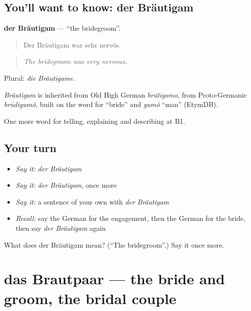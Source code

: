 \subsection*{You'll want to know: der Bräutigam}
\textbf{der Bräutigam} — \textquotedblleft{}the bridegroom\textquotedblright{}.

\begin{quote}
Der Bräutigam war sehr nervös.
\end{quote}

\begin{quote}
\emph{The bridegroom was very nervous.}
\end{quote}

Plural: \emph{die Bräutigame}.

\begin{cousinweb}
\emph{Bräutigam} is inherited from Old High German \emph{brūtigomo}, from Proto-Germanic \emph{brūdigumô}, built on the word for \textquotedblleft{}bride\textquotedblright{} and \emph{gumô} \textquotedblleft{}man\textquotedblright{} (EtymDB).
\end{cousinweb}

\begin{grammarlens}[title={What you've built}]
One more word for telling, explaining and describing at B1.
\end{grammarlens}

\subsection*{Your turn}
\begin{itemize}
\raggedright
  \item \emph{Say it:} \emph{der Bräutigam}
  \item \emph{Say it:} \emph{der Bräutigam}, once more
  \item \emph{Say it:} a sentence of your own with \emph{der Bräutigam}
  \item \emph{Recall:} say the German for the engagement, then the German for the bride, then say \emph{der Bräutigam} again
\end{itemize}

\begin{tcolorbox}[breakable,colback=teal!4,colframe=teal!35!black,title={Before you move on}]
What does der Bräutigam mean? (\textquotedblleft{}The bridegroom\textquotedblright{}.) Say it once more.
\end{tcolorbox}
\section[das Brautpaar]{das Brautpaar — the bride and groom, the bridal couple}

